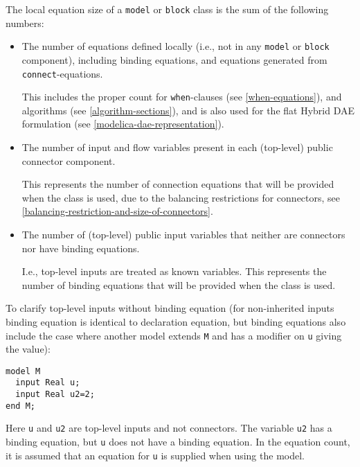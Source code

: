\begin{definition}
The local equation size of a \lstinline!model! or \lstinline!block! class is the sum of the following numbers:
\begin{itemize}
\item
  The number of equations defined locally (i.e., not in any \lstinline!model! or \lstinline!block! component), including binding equations, and equations generated from \lstinline!connect!-equations.
  \begin{nonnormative}
  This includes the proper count for \lstinline!when!-clauses (see \cref{when-equations}), and algorithms (see \cref{algorithm-sections}), and is also used for
  the flat Hybrid DAE formulation (see \cref{modelica-dae-representation}).
  \end{nonnormative}
\item
  The number of input and flow variables present in each (top-level) public connector component.
  \begin{nonnormative}
  This represents the number of connection equations that will be provided when the class is used, due to the balancing restrictions for connectors, see \cref{balancing-restriction-and-size-of-connectors}.
  \end{nonnormative}
\item
  The number of (top-level) public input variables that neither are connectors nor have binding equations.
  \begin{nonnormative}
  I.e., top-level inputs are treated as known variables.  This represents the number of binding equations that will be provided when the class is used.
  \end{nonnormative}
\end{itemize}
\end{definition}

\begin{nonnormative}
To clarify top-level inputs without binding equation (for
non-inherited inputs binding equation is identical to declaration
equation, but binding equations also include the case where another
model extends \lstinline!M! and has a modifier on \lstinline!u! giving the value):
\begin{lstlisting}[language=modelica]
model M
  input Real u;
  input Real u2=2;
end M;
\end{lstlisting}

Here \lstinline!u! and \lstinline!u2! are top-level inputs and not connectors. The
variable \lstinline!u2! has a binding equation, but \lstinline!u! does not have a binding
equation. In the equation count, it is assumed that an equation for \lstinline!u! is
supplied when using the model.
\end{nonnormative}

